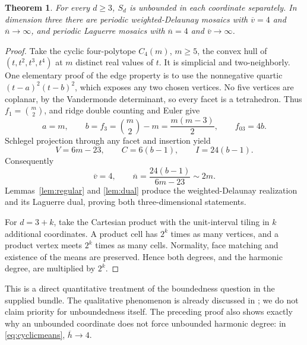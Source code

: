 \documentclass[11pt,a4paper]{article}
\newtheorem{theorem}{Theorem}[section]
\theoremstyle{definition}\newtheorem{definition}[theorem]{Definition}
\theoremstyle{remark}\newtheorem{remark}[theorem]{Remark}
\newcommand{\hbarM}{\overline h}\newcommand{\nbar}{\overline n}\newcommand{\vbar}{\overline v}
\begin{document}
\begin{theorem}\label{thm:degrees}
For every \(d\ge3\), \(S_d\) is unbounded in each coordinate separately. In dimension three there are periodic weighted-Delaunay mosaics with \(\vbar=4\) and \(\nbar\to\infty\), and periodic Laguerre mosaics with \(\nbar=4\) and \(\vbar\to\infty\).
\end{theorem}
\begin{proof}
Take the cyclic four-polytope \(C_4(m)\), \(m\ge5\), the convex hull of \((t,t^2,t^3,t^4)\) at \(m\) distinct real values of \(t\). It is simplicial and two-neighborly. One elementary proof of the edge property is to use the nonnegative quartic \((t-a)^2(t-b)^2\), which exposes any two chosen vertices. No five vertices are coplanar, by the Vandermonde determinant, so every facet is a tetrahedron. Thus \(f_1=\binom m2\), and ridge double counting and Euler give
\[
 a=m,\qquad b=f_3=\binom m2-m=\frac{m(m-3)}2,\qquad f_{03}=4b.
\]
Schlegel projection through any facet and insertion yield
\[
 V=6m-23,\qquad C=6(b-1),\qquad I=24(b-1).
\]
Consequently
\begin{equation}\label{eq:cyclicmeans}
 \vbar=4,\qquad \nbar=\frac{24(b-1)}{6m-23}\sim2m.
\end{equation}
Lemmas~\ref{lem:regular} and \ref{lem:dual} produce the weighted-Delaunay realization and its Laguerre dual, proving both three-dimensional statements.

For \(d=3+k\), take the Cartesian product with the unit-interval tiling in \(k\) additional coordinates. A product cell has \(2^k\) times as many vertices, and a product vertex meets \(2^k\) times as many cells. Normality, face matching and existence of the means are preserved. Hence both degrees, and the harmonic degree, are multiplied by \(2^k\).
\end{proof}

This is a direct quantitative treatment of the boundedness question in the supplied bundle. The qualitative phenomenon is already discussed in \citet[Section 7]{Z02}; we do not claim priority for unboundedness itself. The preceding proof also shows exactly why an unbounded coordinate does not force unbounded harmonic degree: in \eqref{eq:cyclicmeans}, \(\hbarM\to4\).
\end{document}
